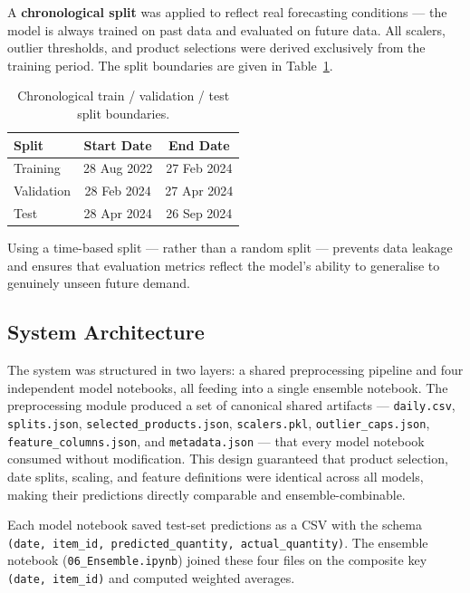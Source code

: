 \documentclass[12pt, a4paper]{article}
\begin{document}
A \textbf{chronological split} was applied to reflect real forecasting conditions —
the model is always trained on past data and evaluated on future data. All scalers,
outlier thresholds, and product selections were derived exclusively from the training
period. The split boundaries are given in Table~\ref{tab:splits}.

\begin{table}[H]
    \centering
    \caption{Chronological train / validation / test split boundaries.}
    \label{tab:splits}
    \renewcommand{\arraystretch}{1.2}
    \begin{tabular}{@{}lcc@{}}
        \toprule
        \textbf{Split} & \textbf{Start Date} & \textbf{End Date} \\
        \midrule
        Training   & 28 Aug 2022 & 27 Feb 2024 \\
        Validation & 28 Feb 2024 & 27 Apr 2024 \\
        Test       & 28 Apr 2024 & 26 Sep 2024 \\
        \bottomrule
    \end{tabular}
\end{table}

Using a time-based split — rather than a random split — prevents data leakage and
ensures that evaluation metrics reflect the model's ability to generalise to genuinely
unseen future demand.

\subsection{System Architecture}
\label{subsec:architecture}

The system was structured in two layers: a shared preprocessing pipeline and four
independent model notebooks, all feeding into a single ensemble notebook. The preprocessing
module produced a set of canonical shared artifacts — \texttt{daily.csv},
\texttt{splits.json}, \texttt{selected\_products.json}, \texttt{scalers.pkl},
\texttt{outlier\_caps.json}, \texttt{feature\_columns.json}, and \texttt{metadata.json}
— that every model notebook consumed without modification. This design guaranteed that
product selection, date splits, scaling, and feature definitions were identical across all
models, making their predictions directly comparable and ensemble-combinable.

Each model notebook saved test-set predictions as a CSV with the schema
\texttt{(date, item\_id, predicted\_quantity, actual\_quantity)}. The ensemble notebook
(\texttt{06\_Ensemble.ipynb}) joined these four files on the composite key
\texttt{(date, item\_id)} and computed weighted averages.
\end{document}
